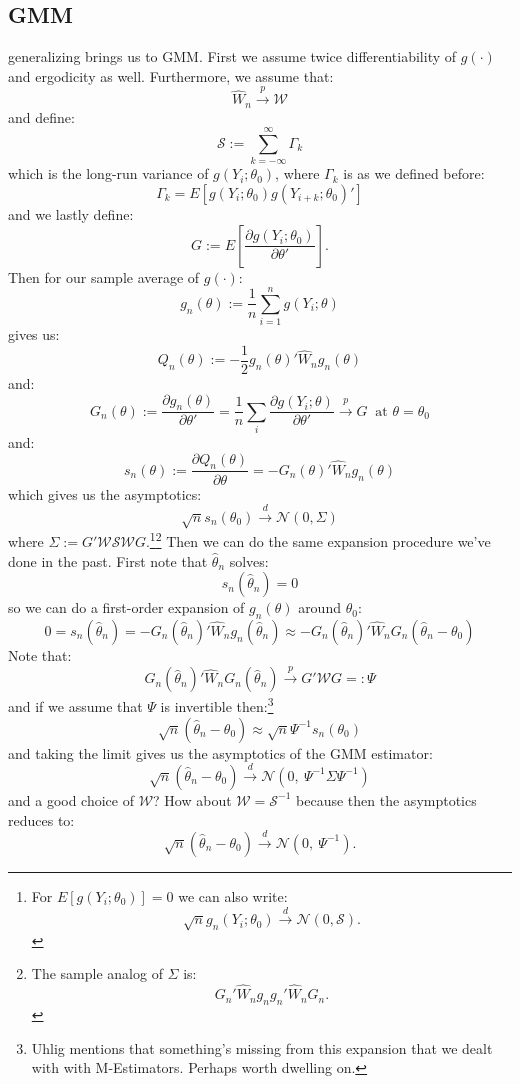 \documentclass{tufte-book}
\theoremstyle{mytheoremstyle}
\theoremstyle{mylemstyle}
\theoremstyle{mydefstyle}
\begin{document}
\subsection{GMM}
 generalizing brings us to GMM. First we assume twice differentiability of \(g(\cdot)\) and ergodicity as well. Furthermore, we assume that:
	\[\hat{W}_n \overset{p}{\rightarrow} \mathcal{W}\]
and define:
	\[\mathcal{S} := \sum_{k=-\infty}^\infty \Gamma_k\]
which is the long-run variance of \(g(Y_i; \theta_0)\), where \(\Gamma_k\) is as we defined before:
	\[\Gamma_k = E[g(Y_i; \theta_0) g(Y_{i+k}; \theta_0)']\]
and we lastly define:
	\[G:= E\left[\frac{\partial g(Y_i; \theta_0)}{\partial \theta'}\right] \text{.}\]
Then for our sample average of \(g(\cdot)\):
	\[g_n(\theta) := \frac{1}{n} \sum_{i=1}^n g(Y_i; \theta)\]
gives us:
	\[Q_n(\theta) := -\frac{1}{2} g_n(\theta)'\hat{W}_n g_n(\theta)\]
and:
	\[G_n(\theta) := \frac{\partial g_n(\theta)}{\partial \theta'} = \frac{1}{n} \sum_i \frac{\partial g(Y_i; \theta)}{\partial \theta'} \overset{p}{\rightarrow} G\ \text{ at } \theta = \theta_0\]
and:
	\[s_n(\theta) := \frac{\partial Q_n(\theta)}{\partial \theta} = -G_n(\theta)'\hat{W}_n g_n(\theta)\]
which gives us the asymptotics:
	\[\sqrt{n}s_n(\theta_0) \overset{d}{\rightarrow} \mathcal{N}(0, \Sigma)\]
where \(\Sigma := G'\mathcal{W}\mathcal{S}\mathcal{W}G\).\footnote{For \(E[g(Y_i; \theta_0)] = 0\) we can also write:
	\[\sqrt{n}g_n(Y_i; \theta_0) \overset{d}{\rightarrow} \mathcal{N}(0, \mathcal{S}) \text{.}\]}\footnote{The sample analog of \(\Sigma\) is:
		\[G_n' \hat{W}_n g_n g_n' \hat{W}_n G_n \text{.}\]}
Then we can do the same expansion procedure we've done in the past. First note that \(\hat{\theta}_n\) solves:
	\[s_n(\hat{\theta}_n) = 0\]
so we can do a first-order expansion of \(g_n(\theta)\) around \(\theta_0\):
	\[0 = s_n(\hat{\theta}_n) = -G_n(\hat{\theta}_n)'\hat{W}_n g_n(\hat{\theta}_n) \approx -G_n(\hat{\theta}_n)'\hat{W}_n G_n(\hat{\theta}_n - \theta_0)\]
Note that:
	\[G_n(\hat{\theta}_n)'\hat{W}_nG_n(\hat{\theta}_n) \overset{p}{\rightarrow} G'\mathcal{W}G =: \Psi\]
and if we assume that \(\Psi\) is invertible then:\footnote{Uhlig mentions that something's missing from this expansion that we dealt with with M-Estimators. Perhaps worth dwelling on.} 
	\[\sqrt{n}(\hat{\theta}_n - \theta_0) \approx \sqrt{n}\Psi^{-1}s_n(\theta_0)\]
and taking the limit gives us the asymptotics of the GMM estimator:
	\[\sqrt{n}(\hat{\theta}_n - \theta_0) \overset{d}{\rightarrow} \mathcal{N}(0,\ \Psi^{-1}\Sigma \Psi^{-1})\]
and a good choice of \(\mathcal{W}\)? How about \(\mathcal{W} = \mathcal{S}^{-1}\) because then the asymptotics reduces to:
	\[\sqrt{n}(\hat{\theta}_n - \theta_0) \overset{d}{\rightarrow} \mathcal{N}(0,\ \Psi^{-1}) \text{.}\]
\end{document}
